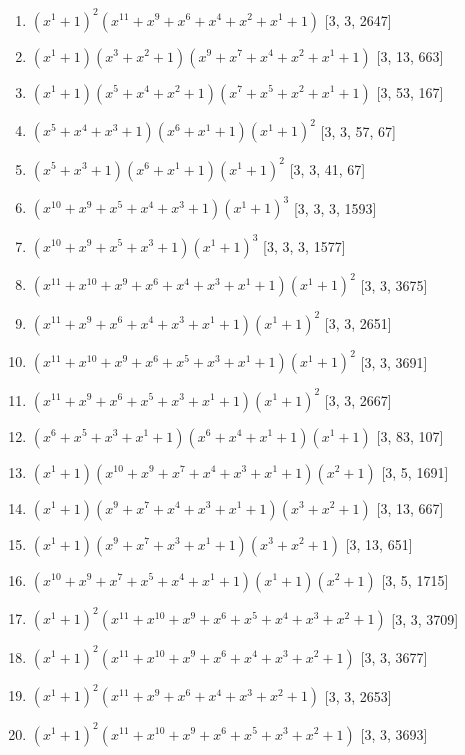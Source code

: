 \documentclass[10pt,twocolumn]{article}
\begin{document}
\begin{enumerate}
\item $(x^{1} + 1)^{2}(x^{11} + x^{9} + x^{6} + x^{4} + x^{2} + x^{1} + 1)$  [3, 3, 2647]
\item $(x^{1} + 1)(x^{3} + x^{2} + 1)(x^{9} + x^{7} + x^{4} + x^{2} + x^{1} + 1)$  [3, 13, 663]
\item $(x^{1} + 1)(x^{5} + x^{4} + x^{2} + 1)(x^{7} + x^{5} + x^{2} + x^{1} + 1)$  [3, 53, 167]
\item $(x^{5} + x^{4} + x^{3} + 1)(x^{6} + x^{1} + 1)(x^{1} + 1)^{2}$  [3, 3, 57, 67]
\item $(x^{5} + x^{3} + 1)(x^{6} + x^{1} + 1)(x^{1} + 1)^{2}$  [3, 3, 41, 67]
\item $(x^{10} + x^{9} + x^{5} + x^{4} + x^{3} + 1)(x^{1} + 1)^{3}$  [3, 3, 3, 1593]
\item $(x^{10} + x^{9} + x^{5} + x^{3} + 1)(x^{1} + 1)^{3}$  [3, 3, 3, 1577]
\item $(x^{11} + x^{10} + x^{9} + x^{6} + x^{4} + x^{3} + x^{1} + 1)(x^{1} + 1)^{2}$  [3, 3, 3675]
\item $(x^{11} + x^{9} + x^{6} + x^{4} + x^{3} + x^{1} + 1)(x^{1} + 1)^{2}$  [3, 3, 2651]
\item $(x^{11} + x^{10} + x^{9} + x^{6} + x^{5} + x^{3} + x^{1} + 1)(x^{1} + 1)^{2}$  [3, 3, 3691]
\item $(x^{11} + x^{9} + x^{6} + x^{5} + x^{3} + x^{1} + 1)(x^{1} + 1)^{2}$  [3, 3, 2667]
\item $(x^{6} + x^{5} + x^{3} + x^{1} + 1)(x^{6} + x^{4} + x^{1} + 1)(x^{1} + 1)$  [3, 83, 107]
\item $(x^{1} + 1)(x^{10} + x^{9} + x^{7} + x^{4} + x^{3} + x^{1} + 1)(x^{2} + 1)$  [3, 5, 1691]
\item $(x^{1} + 1)(x^{9} + x^{7} + x^{4} + x^{3} + x^{1} + 1)(x^{3} + x^{2} + 1)$  [3, 13, 667]
\item $(x^{1} + 1)(x^{9} + x^{7} + x^{3} + x^{1} + 1)(x^{3} + x^{2} + 1)$  [3, 13, 651]
\item $(x^{10} + x^{9} + x^{7} + x^{5} + x^{4} + x^{1} + 1)(x^{1} + 1)(x^{2} + 1)$  [3, 5, 1715]
\item $(x^{1} + 1)^{2}(x^{11} + x^{10} + x^{9} + x^{6} + x^{5} + x^{4} + x^{3} + x^{2} + 1)$  [3, 3, 3709]
\item $(x^{1} + 1)^{2}(x^{11} + x^{10} + x^{9} + x^{6} + x^{4} + x^{3} + x^{2} + 1)$  [3, 3, 3677]
\item $(x^{1} + 1)^{2}(x^{11} + x^{9} + x^{6} + x^{4} + x^{3} + x^{2} + 1)$  [3, 3, 2653]
\item $(x^{1} + 1)^{2}(x^{11} + x^{10} + x^{9} + x^{6} + x^{5} + x^{3} + x^{2} + 1)$  [3, 3, 3693]

\end{enumerate}
\end{document}

